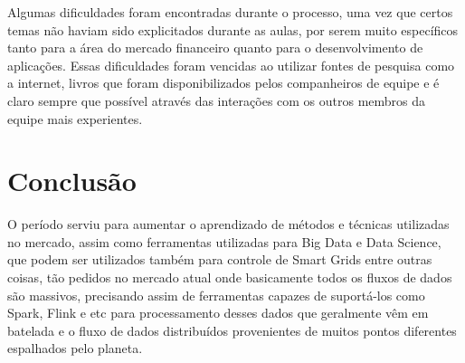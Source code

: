 \documentclass[a4paper]{article}
\begin{document}
Algumas dificuldades foram encontradas durante o processo, uma vez que
certos temas não haviam sido explicitados durante as aulas, por serem
muito específicos tanto para a área do mercado financeiro quanto para
o desenvolvimento de aplicações. Essas dificuldades foram vencidas ao
utilizar fontes de pesquisa como a internet, livros que foram
disponibilizados pelos companheiros de equipe e é claro sempre que
possível através das interações com os outros membros da equipe mais
experientes.

\section{Conclusão}

O período serviu para aumentar o aprendizado de métodos e técnicas
utilizadas no mercado, assim como ferramentas utilizadas para Big Data
e Data Science, que podem ser utilizados também para controle de Smart
Grids entre outras coisas, tão pedidos no mercado atual onde
basicamente todos os fluxos de dados são massivos, precisando assim de
ferramentas capazes de suportá-los como Spark, Flink e etc para
processamento desses dados que geralmente vêm em batelada e o fluxo de
dados distribuídos provenientes de muitos pontos diferentes espalhados
pelo planeta.
\end{document}
